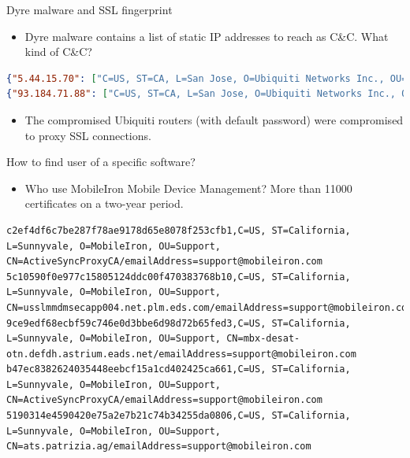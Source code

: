 \begin{frame}[t,fragile]{Dyre malware and SSL fingerprint}
        \begin{itemize}
                \item Dyre malware contains a list of static IP addresses to reach as C\&C. What kind of C\&C?
        \end{itemize}
        \begin{lstlisting}[language=json,firstnumber=1]
{"5.44.15.70": ["C=US, ST=CA, L=San Jose, O=Ubiquiti Networks Inc., OU=Technical Support, CN=UBNT/emailAddress=support@ubnt.com"]}
{"93.184.71.88": ["C=US, ST=CA, L=San Jose, O=Ubiquiti Networks Inc., OU=Technical Support, CN=UBNT/emailAddress=support@ubnt.com"]}
        \end{lstlisting}
        \begin{itemize}
                \item The compromised Ubiquiti routers (with default password) were compromised to proxy SSL connections.
        \end{itemize}
\end{frame}


\begin{frame}[t,fragile]{How to find user of a specific software?}
     \begin{itemize}
             \item Who use MobileIron Mobile Device Management? More than 11000 certificates on a two-year period.
     \end{itemize}
      \begin{lstlisting}[language=brol]
c2ef4df6c7be287f78ae9178d65e8078f253cfb1,C=US, ST=California, L=Sunnyvale, O=MobileIron, OU=Support, CN=ActiveSyncProxyCA/emailAddress=support@mobileiron.com
5c10590f0e977c15805124ddc00f470383768b10,C=US, ST=California, L=Sunnyvale, O=MobileIron, OU=Support, CN=usslmmdmsecapp004.net.plm.eds.com/emailAddress=support@mobileiron.com
9ce9edf68ecbf59c746e0d3bbe6d98d72b65fed3,C=US, ST=California, L=Sunnyvale, O=MobileIron, OU=Support, CN=mbx-desat-otn.defdh.astrium.eads.net/emailAddress=support@mobileiron.com
b47ec8382624035448eebcf15a1cd402425ca661,C=US, ST=California, L=Sunnyvale, O=MobileIron, OU=Support, CN=ActiveSyncProxyCA/emailAddress=support@mobileiron.com
5190314e4590420e75a2e7b21c74b34255da0806,C=US, ST=California, L=Sunnyvale, O=MobileIron, OU=Support, CN=ats.patrizia.ag/emailAddress=support@mobileiron.com
      \end{lstlisting}
\end{frame}

